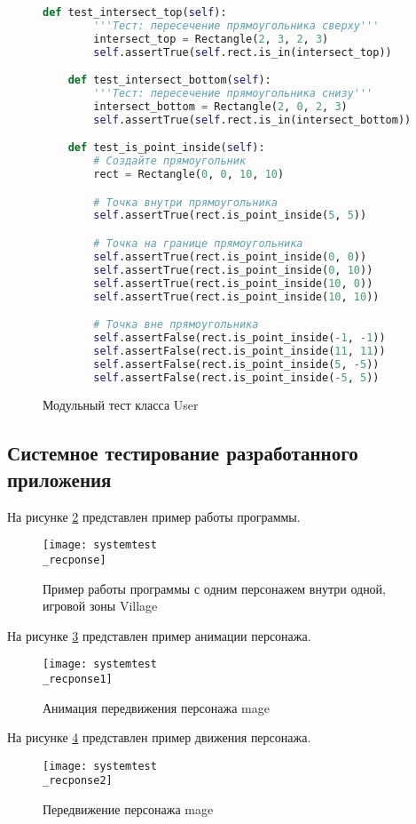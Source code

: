 \begin{figure}[H]
\begin{lstlisting}[language=Python]
	def test_intersect_top(self):
		'''Тест: пересечение прямоугольника сверху'''
		intersect_top = Rectangle(2, 3, 2, 3)
		self.assertTrue(self.rect.is_in(intersect_top))

	def test_intersect_bottom(self):
		'''Тест: пересечение прямоугольника снизу'''
		intersect_bottom = Rectangle(2, 0, 2, 3)
		self.assertTrue(self.rect.is_in(intersect_bottom))

	def test_is_point_inside(self):
		# Создайте прямоугольник
		rect = Rectangle(0, 0, 10, 10)

		# Точка внутри прямоугольника
		self.assertTrue(rect.is_point_inside(5, 5))

		# Точка на границе прямоугольника
		self.assertTrue(rect.is_point_inside(0, 0))
		self.assertTrue(rect.is_point_inside(0, 10))
		self.assertTrue(rect.is_point_inside(10, 0))
		self.assertTrue(rect.is_point_inside(10, 10))

		# Точка вне прямоугольника
		self.assertFalse(rect.is_point_inside(-1, -1))
		self.assertFalse(rect.is_point_inside(11, 11))
		self.assertFalse(rect.is_point_inside(5, -5))
		self.assertFalse(rect.is_point_inside(-5, 5))
\end{lstlisting}  
\caption{Модульный тест класса User}
\label{unitUser:image}
\end{figure}

\subsection{Системное тестирование разработанного приложения}

На рисунке \ref{systemtest_recponse:image} представлен пример работы программы.
\begin{figure}[H]
	\centering
	\texttt{[image: systemtest\\\_recponse]}
	\caption{Пример работы программы с одним персонажем внутри одной, игровой зоны Village}
	\label{systemtest_recponse:image}
\end{figure}

На рисунке \ref{systemtest_recponse1:image} представлен пример анимации персонажа.
\begin{figure}[H]
	\centering
	\texttt{[image: systemtest\\\_recponse1]}
	\caption{Анимация передвижения персонажа mage}
	\label{systemtest_recponse1:image}
\end{figure}

На рисунке \ref{systemtest_recponse2:image} представлен пример движения персонажа.
\begin{figure}[H]
	\centering
	\texttt{[image: systemtest\\\_recponse2]}
	\caption{Передвижение персонажа mage}
	\label{systemtest_recponse2:image}
\end{figure}

